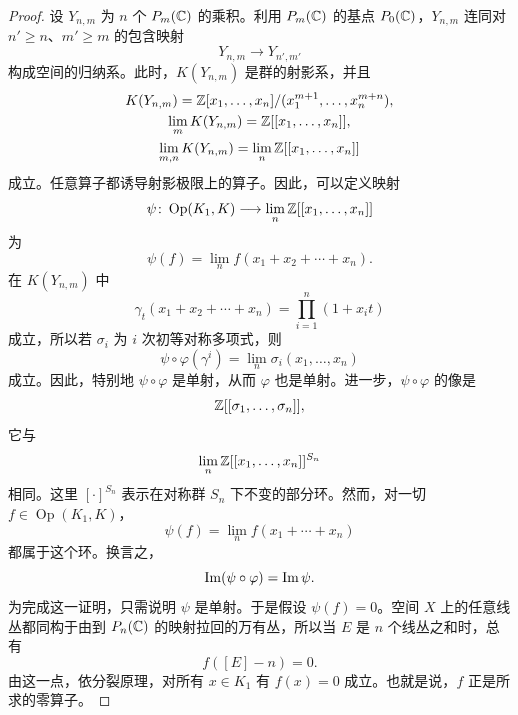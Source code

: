 \begin{proof}
设 $Y_{n,m}$ 为 $n$ 个 $P_m(\mathbb{C})$ 的乘积。利用 $P_m(\mathbb{C})$ 的基点 $P_0(\mathbb{C})$，$Y_{n,m}$ 连同对 $n'\ge n$、$m'\ge m$ 的包含映射
\[
Y_{n,m}\longrightarrow Y_{n',m'}
\]
构成空间的归纳系。此时，$K(Y_{n,m})$ 是群的射影系，并且
\begin{gather*}
K(Y_{n,m})=\mathbb{Z}[x_1,\dots,x_n]/(x_1^{m+1},\dots,x_n^{m+n}),\\
\lim_{m}K(Y_{n,m})=\mathbb{Z}[[x_1,\dots,x_n]],\\
\lim_{m,n}K(Y_{n,m})=\lim_{n}\mathbb{Z}[[x_1,\dots,x_n]]
\end{gather*}
成立。任意算子都诱导射影极限上的算子。因此，可以定义映射
\[
\psi\colon \operatorname{Op}(K_1,K)\longrightarrow \lim_{n}\mathbb{Z}[[x_1,\dots,x_n]]
\]
为
\[
\psi(f)=\lim_{n}f(x_1+x_2+\cdots+x_n).
\]
在 $K(Y_{n,m})$ 中
\[
\gamma_t(x_1+x_2+\cdots+x_n)=\prod_{i=1}^{n}(1+x_it)
\]
成立，所以若 $\sigma_i$ 为 $i$ 次初等对称多项式，则
\[
\psi\circ\varphi(\gamma^i)=\lim_{n}\sigma_i(x_1,\dots,x_n)
\]
成立。因此，特别地 $\psi\circ\varphi$ 是单射，从而 $\varphi$ 也是单射。进一步，$\psi\circ\varphi$ 的像是
\[
\mathbb{Z}[[\sigma_1,\dots,\sigma_n]],
\]
它与
\[
\lim_{n}\mathbb{Z}[[x_1,\dots,x_n]]^{S_n}
\]
相同。这里 $[\cdot]^{S_n}$ 表示在对称群 $S_n$ 下不变的部分环。然而，对一切 $f\in\operatorname{Op}(K_1,K)$，
\[
\psi(f)=\lim_{n}f(x_1+\cdots+x_n)
\]
都属于这个环。换言之，
\[
\operatorname{Im}(\psi\circ\varphi)=\operatorname{Im}\psi.
\]
为完成这一证明，只需说明 $\psi$ 是单射。于是假设 $\psi(f)=0$。空间 $X$ 上的任意线丛都同构于由到 $P_n(\mathbb{C})$ 的映射拉回的万有丛，所以当 $E$ 是 $n$ 个线丛之和时，总有
\[
f([E]-n)=0.
\]
由这一点，依分裂原理，对所有 $x\in K_1$ 有 $f(x)=0$ 成立。也就是说，$f$ 正是所求的零算子。
\end{proof}


